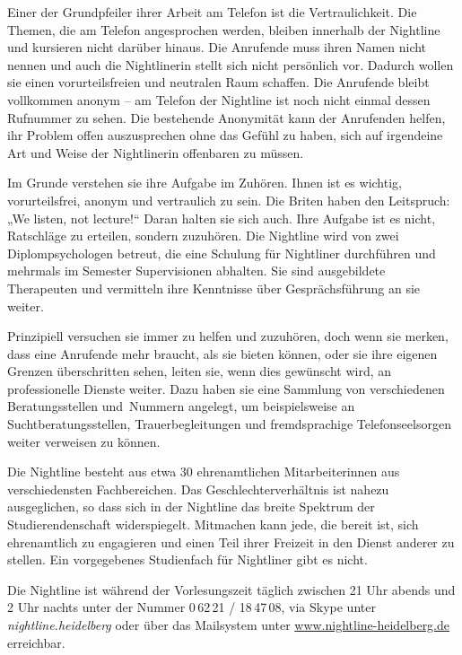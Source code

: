 Einer der Grundpfeiler ihrer Arbeit am Telefon ist die Vertraulichkeit. Die Themen, die am Telefon angesprochen werden, bleiben innerhalb der Nightline und kursieren nicht darüber hinaus. Die Anrufende muss ihren Namen nicht nennen und auch die Nightlinerin stellt sich nicht persönlich vor. Dadurch wollen sie einen vorurteilsfreien und neutralen Raum schaffen. Die Anrufende bleibt vollkommen anonym – am Telefon der Nightline ist noch nicht einmal dessen Rufnummer zu sehen. Die bestehende Anonymität kann der Anrufenden helfen, ihr Problem offen auszusprechen ohne das Gefühl zu haben, sich auf irgendeine Art und Weise der Nightlinerin offenbaren zu müssen.

Im Grunde verstehen sie ihre Aufgabe im Zuhören. Ihnen ist es wichtig, vorurteilsfrei, anonym und vertraulich zu sein. Die Briten haben den Leitspruch: „We listen, not lecture!“ Daran halten sie sich auch. Ihre Aufgabe ist es nicht, Ratschläge zu erteilen, sondern zuzuhören. Die Nightline wird von zwei Diplompsychologen betreut, die eine Schulung für Nightliner durchführen und mehrmals im Semester Supervisionen abhalten. Sie sind ausgebildete Therapeuten und vermitteln ihre Kenntnisse über Gesprächsführung an sie weiter.

Prinzipiell versuchen sie immer zu helfen und zuzuhören, doch wenn sie merken, dass eine Anrufende mehr braucht, als sie bieten können, oder sie ihre eigenen Grenzen überschritten sehen, leiten sie, wenn dies gewünscht wird, an professionelle Dienste weiter. Dazu haben sie eine Sammlung von verschiedenen Beratungsstellen und~Nummern angelegt, um beispielsweise an Suchtberatungsstellen, Trauerbegleitungen und fremdsprachige Telefonseelsorgen weiter verweisen zu können.

Die Nightline besteht aus etwa 30 ehrenamtlichen Mitarbeiterinnen aus verschiedensten Fachbereichen. Das Geschlechterverhältnis ist nahezu ausgeglichen, so dass sich in der Nightline das breite Spektrum der Studierendenschaft widerspiegelt. Mitmachen kann jede, die bereit ist, sich ehrenamtlich zu engagieren und einen Teil ihrer Freizeit in den Dienst anderer zu stellen. Ein vorgegebenes Studienfach für Nightliner gibt es nicht.

Die Nightline ist während der Vorlesungszeit täglich zwischen 21 Uhr abends und 2 Uhr nachts unter der Nummer 0\,62\,21 / 18\,47\,08, via Skype unter \emph{nightline.heidelberg} oder über das Mailsystem unter \url{www.nightline-heidelberg.de} erreichbar.
